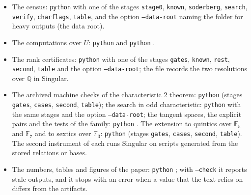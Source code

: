 \documentclass[11pt]{article}
\theoremstyle{definition}
\theoremstyle{remark}
\newcommand{\Q}{\mathbb{Q}}
\newcommand{\F}{\mathbb{F}}
\begin{document}
\begin{itemize}\raggedright
\item The census: \texttt{python}  with one of the stages \texttt{stage0}, \texttt{known}, \texttt{soderberg}, \texttt{search}, \texttt{verify}, \texttt{charflags}, \texttt{table}, and the option \texttt{--data-root} naming the folder for heavy outputs (the data root).
\item The computations over $U$: \texttt{python}  and \texttt{python} .\item The rank certificates: \texttt{python}  with one of the stages \texttt{gates}, \texttt{known}, \texttt{rest}, \texttt{second}, \texttt{table} and the option \texttt{--data-root}; the file  records the two resolutions over $\Q$ in Singular.
\item The archived machine checks of the characteristic $2$ theorem: \texttt{python}  (stages \texttt{gates}, \texttt{cases}, \texttt{second}, \texttt{table}); the search in odd characteristic: \texttt{python}  with the same stages and the option \texttt{--data-root}; the tangent spaces, the explicit pairs and the tests of the family: \texttt{python} . The extension to quintics over $\F_5$ and $\F_7$ and to sextics over $\F_3$: \texttt{python}  (stages \texttt{gates}, \texttt{cases}, \texttt{second}, \texttt{table}). The second instrument of each runs Singular on scripts generated from the stored relations or bases.
\item The numbers, tables and figures of the paper: \texttt{python} ; with \texttt{--check} it reports stale outputs, and it stops with an error when a value that the text relies on differs from the artifacts.
\end{itemize}
\end{document}
